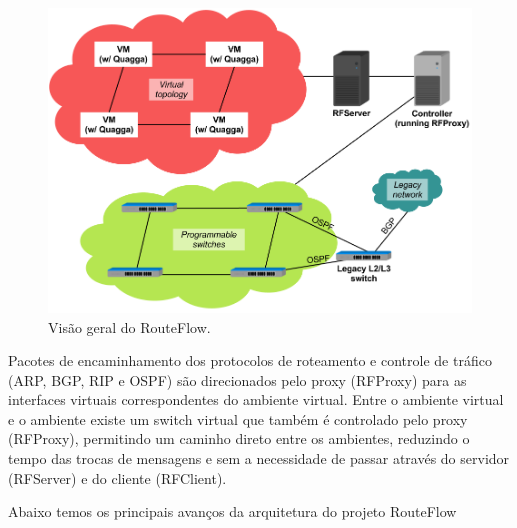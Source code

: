 \begin{figure}[h]
\centering
\includegraphics[width=160mm]{visaoGeralRouteFlow.png}
\caption{Visão geral do RouteFlow.}
\label{fig:visaoGeralRouteFlow} 
\end{figure}


Pacotes de encaminhamento dos protocolos de roteamento 
e controle de tráfico (ARP, BGP, RIP e OSPF) são direcionados
pelo proxy (RFProxy) para as interfaces virtuais correspondentes do
ambiente virtual. Entre o ambiente virtual e o ambiente existe
um switch virtual que também é controlado pelo proxy (RFProxy),
permitindo um caminho direto entre os ambientes, reduzindo 
o tempo das trocas de mensagens e sem a necessidade de passar
através do servidor (RFServer) e do cliente (RFClient).

Abaixo temos os principais avanços da arquitetura do projeto
RouteFlow

